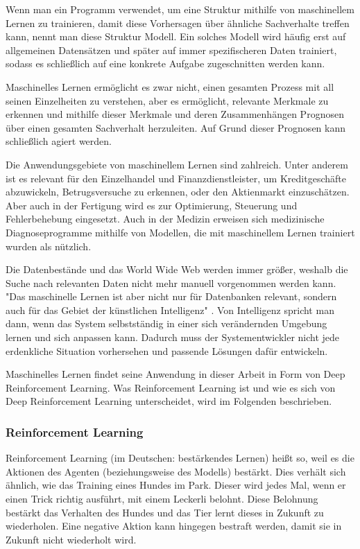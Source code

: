 Wenn man ein Programm verwendet, um eine Struktur mithilfe von maschinellem Lernen zu trainieren, damit diese Vorhersagen über ähnliche Sachverhalte treffen kann, nennt man diese Struktur Modell. Ein solches Modell wird häufig erst auf allgemeinen Datensätzen und später auf immer spezifischeren Daten trainiert, sodass es schließlich auf eine konkrete Aufgabe zugeschnitten werden kann. \cite[S. 1f]{alpaydin_maschinelles_2022}

Maschinelles Lernen ermöglicht es zwar nicht, einen gesamten Prozess mit all seinen Einzelheiten zu verstehen, aber es ermöglicht, relevante Merkmale zu erkennen und mithilfe dieser Merkmale und deren Zusammenhängen Prognosen über einen gesamten Sachverhalt herzuleiten. Auf Grund dieser Prognosen kann schließlich agiert werden. \cite[S. 2]{alpaydin_maschinelles_2022}

Die Anwendungsgebiete von maschinellem Lernen sind zahlreich. Unter anderem ist es relevant für den Einzelhandel und Finanzdienstleister, um Kreditgeschäfte abzuwickeln, Betrugsversuche zu erkennen, oder den Aktienmarkt einzuschätzen. Aber auch in der Fertigung wird es zur Optimierung, Steuerung und Fehlerbehebung eingesetzt. Auch in der Medizin erweisen sich medizinische Diagnoseprogramme mithilfe von Modellen, die mit maschinellem Lernen trainiert wurden als nützlich. \cite[S. 3]{alpaydin_maschinelles_2022}

Die Datenbestände und das World Wide Web werden immer größer, weshalb die Suche nach relevanten Daten nicht mehr manuell vorgenommen werden kann. "Das maschinelle Lernen ist aber nicht nur für Datenbanken relevant, sondern auch für das Gebiet der künstlichen Intelligenz" \cite[S. 3]{alpaydin_maschinelles_2022}. Von Intelligenz spricht man dann, wenn das System selbstständig in einer sich verändernden Umgebung lernen und sich anpassen kann. Dadurch muss der Systementwickler nicht jede erdenkliche Situation vorhersehen und passende Lösungen dafür entwickeln. \cite[S. 3]{alpaydin_maschinelles_2022}
 
Maschinelles Lernen findet seine Anwendung in dieser Arbeit in Form von Deep Reinforcement Learning. Was Reinforcement Learning ist und wie es sich von Deep Reinforcement Learning unterscheidet, wird im Folgenden beschrieben.
\subsubsection{Reinforcement Learning}
Reinforcement Learning (im Deutschen: bestärkendes Lernen) heißt so, weil es die Aktionen des Agenten (beziehungsweise des Modells) bestärkt. Dies verhält sich ähnlich, wie das Training eines Hundes im Park. Dieser wird jedes Mal, wenn er einen Trick richtig ausführt, mit einem Leckerli belohnt. Diese Belohnung bestärkt das Verhalten des Hundes und das Tier lernt dieses in Zukunft zu wiederholen. Eine negative Aktion kann hingegen bestraft werden, damit sie in Zukunft nicht wiederholt wird. \cite[S. 11]{ris-ala_fundamentals_2023}

